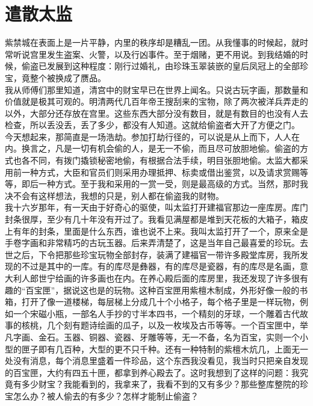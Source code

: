 \fancyhead[RO]{} %
\fancyhead[LE]{} %
\chapter*{遣散太监}
\thispagestyle{empty}
紫禁城在表面上是一片平静，内里的秩序却是糟乱一团。从我懂事的时候起，就时常听说宫里发生盗案、火警，以及行凶事件。至于烟赌，更不用说。到我结婚的时候，偷盗已发展到这种程度：刚行过婚礼，由珍珠玉翠装嵌的皇后凤冠上的全部珍宝，竟整个被换成了赝品。\\

我从师傅们那里知道，清宫中的财宝早已在世界上闻名。只说古玩字画，那数量和价值就是极其可观的。明清两代几百年帝王搜刮来的宝物，除了两次被洋兵弄走的以外，大部分还存放在宫里。这些东西大部分没有数目，就是有数目的也没有人去检查，所以丢没丢，丢了多少，都没有人知道。这就给偷盗者大开了方便之门。\\

今天想起来，那简直是一场浩劫。参加打劫行径的，可以说是从上而下，人人在内。换言之，凡是一切有机会偷的人，是无一不偷，而且尽可放胆地偷。偷盗的方式也各不同，有拨门撬锁秘密地偷，有根据合法手续，明目张胆地偷。太监大都采用前一种方式，大臣和官员们则采用办理抵押、标卖或借出鉴赏，以及请求赏赐等等，即后一种方式。至于我和采用的一赏一受，则是最高级的方式。当然，那时我决不会有这样想法，我想的只是，别人都在偷盗我的财物。\\

我十六岁那年，有一天由于好奇心的驱使，叫太监打开建福官那边一座库房。库门封条很厚，至少有几十年没有开过了。我看见满屋都是堆到天花板的大箱子，箱皮上有年的封条，里面是什么东西，谁也说不上来。我叫太监打开了一个，原来全是手卷字画和非常精巧的古玩玉器。后来弄清楚了，这是当年自己最喜爱的珍玩。去世之后，下令把那些珍宝玩物全部封存，装满了建福官一带许多殿堂库房，我所发现的不过是其中的一库。有的库尽是彝器，有的库尽是瓷器，有的库尽是名画，意大利人郎世宁给画的许多画也在内。在养心殿后面的库房里，我还发现了许多很有趣的“百宝匣”，据说这也是的玩物。这种百宝匣用紫檀木制成，外形好像一般的书箱，打开了像一道楼梯，每层梯上分成几十个小格子，每个格子里是一样玩物，例如一个宋磁小瓶，一部名人手抄的寸半本四书，一个精刻的牙球，一个雕着古代故事的核桃，几个刻有题诗绘画的瓜子，以及一枚埃及古币等等。一个百宝匣中，举凡字画、金石。玉器、铜器、瓷器、牙雕等等，无一不备，名为百宝，实则一个小型的匣子即有几百种，大型的更不只千种。还有一种特制的紫檀木炕几，上面无一处没有消息，每个消息里盛着一件珍品，这个东西我没看见，我当时只把亲自发现的百宝匣，大约有四五十匣，都拿到养心殿去了。这时我想到了这样的问题：我究竟有多少财宝？我能看到的，我拿来了，我看不到的又有多少？那些整库整院的珍宝怎么办？被人偷去的有多少？怎样才能制止偷盗？\\

